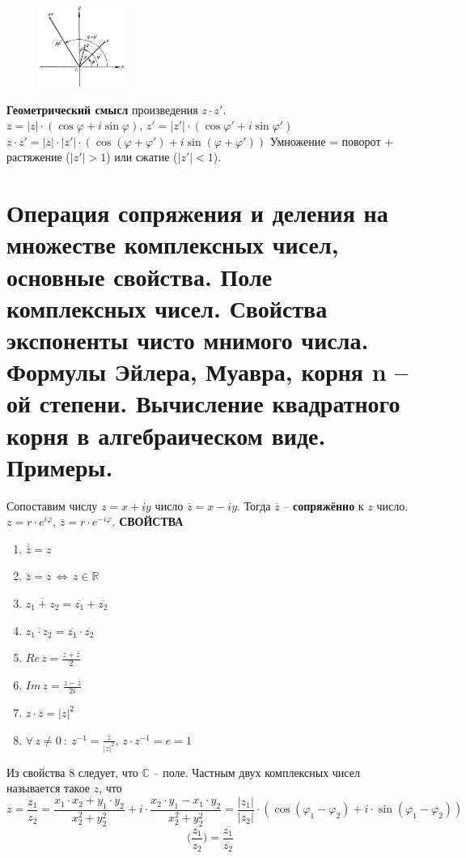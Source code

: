 \documentclass{article}
\newcommand{\R}{\mathbb R}
\newcommand{\n}{\bigbreak}
\begin{document}
\begin{figure}
    \centering
    \includegraphics[width=0.25\textwidth]{ko.png}
\end{figure}
\textbf{Геометрический смысл} произведения $z\cdot z'$.
\newline
\newline
$z=|z|\cdot(\cos\varphi+i\sin\varphi),\,z'=|z'|\cdot(\cos\varphi'+i\sin\varphi')$
\newline
\newline
$z\cdot z'=|z|\cdot|z'|\cdot(\cos(\varphi+\varphi')+i\sin(\varphi+\varphi'))$
\newline
\newline
Умножение = поворот + растяжение ($|z'|>1$) или сжатие ($|z'|<1$).

\newpage
\section{Операция сопряжения и деления на множестве комплексных чисел, основные свойства. Поле комплексных чисел. Свойства экспоненты чисто мнимого числа. Формулы Эйлера, Муавра, корня n – ой степени. Вычисление квадратного корня в алгебраическом виде. Примеры.}
Сопоставим числу $z=x+iy$ число $\overline{z}=x-iy$. Тогда $\overline{z}$ -- \textbf{сопряжённо} к $z$ число. $z=r\cdot e^{i\varphi},\,\overline{z}=r\cdot e^{-i\varphi}$.
\n 
\textbf{СВОЙСТВА}
\begin{enumerate}
    \item $\overline{\overline{z}}=z$
    \item $\overline{z}=z\,\Leftrightarrow\,z\in\R$
    \item $\overline{z_1+z_2}=\overline{z_1}+\overline{z_2}$
    \item $\overline{z_1\cdot z_2}=\overline{z_1}\cdot\overline{z_2}$
    \item $Re\, z=\frac{z+\overline{z}}{2}$
    \item $Im\,z=\frac{z-\overline{z}}{2i}$
    \item $z\cdot\overline{z}=|z|^2$
    \item $\forall\,z\neq 0\::\:z^{-1}=\frac{\overline{z}}{|z|^2}$, $z\cdot z^{-1}=e=1$
\end{enumerate}
Из свойства 8 следует, что $\mathbb{C}$ -- поле.
\newline
\newline
Частным двух комплексных чисел называется такое $z$, что
$$ z=\frac{z_1}{z_2}=\frac{x_1\cdot x_2+y_1\cdot y_2}{x_2^2+y_2^2}+i\cdot\frac{x_2\cdot y_1-x_1\cdot y_2}{x_2^2+y_2^2} = \frac{|z_1|}{|z_2|}\cdot(\cos(\varphi_1-\varphi_2)+i\cdot\sin(\varphi_1-\varphi_2)) $$
$$ \overline{\bigg(\frac{z_1}{z_2}\bigg)}=\frac{\overline{z_1}}{\overline{z_2}} $$
\newpage
\end{document}
